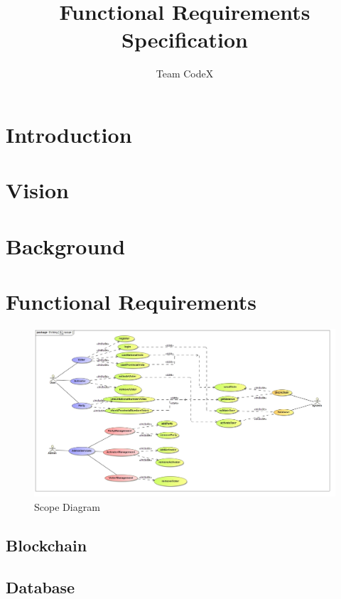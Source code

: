\documentclass[11pt]{article}
\author{Team CodeX}
\title{Functional Requirements Specification}
\begin{document}
	\setlength{\parskip}{6pt}
	
	
	
	\tableofcontents
	\newpage
	
	\listoffigures
	\newpage
	
	\section{Introduction}
		
	
	\section{Vision}
		
	
	\section{Background}
		
		\newpage
		
	\section{Functional Requirements}
	\begin{figure}[H]
		\centering
		\includegraphics[width=\linewidth]{../Images/System/Scope.jpg}
		\caption{Scope Diagram}
	\end{figure}
	
	\newpage

	\subsection{Blockchain}
		
		
	\subsection{Database}
		
		
\end{document}
